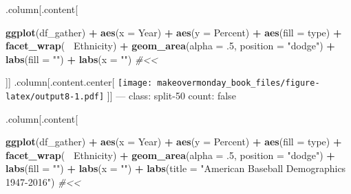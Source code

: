 \documentclass[]{book}
\newenvironment{Shaded}{\begin{snugshade}}{\end{snugshade}}
\newcommand{\KeywordTok}[1]{\textcolor[rgb]{0.13,0.29,0.53}{\textbf{#1}}}
\newcommand{\DataTypeTok}[1]{\textcolor[rgb]{0.13,0.29,0.53}{#1}}
\newcommand{\DecValTok}[1]{\textcolor[rgb]{0.00,0.00,0.81}{#1}}
\newcommand{\StringTok}[1]{\textcolor[rgb]{0.31,0.60,0.02}{#1}}
\newcommand{\CommentTok}[1]{\textcolor[rgb]{0.56,0.35,0.01}{\textit{#1}}}
\newcommand{\OperatorTok}[1]{\textcolor[rgb]{0.81,0.36,0.00}{\textbf{#1}}}
\newcommand{\NormalTok}[1]{#1}
\theoremstyle{definition}
\theoremstyle{definition}
\theoremstyle{definition}
\theoremstyle{remark}
\begin{document}
.column{[}.content{[}

\begin{Shaded}
\begin{Highlighting}[]
\KeywordTok{ggplot}\NormalTok{(df_gather) }\OperatorTok{+}
\StringTok{  }\KeywordTok{aes}\NormalTok{(}\DataTypeTok{x =}\NormalTok{ Year) }\OperatorTok{+}
\StringTok{  }\KeywordTok{aes}\NormalTok{(}\DataTypeTok{y =}\NormalTok{ Percent) }\OperatorTok{+}
\StringTok{  }\KeywordTok{aes}\NormalTok{(}\DataTypeTok{fill =}\NormalTok{ type) }\OperatorTok{+}
\StringTok{  }\KeywordTok{facet_wrap}\NormalTok{(}\OperatorTok{~}\StringTok{ }\NormalTok{Ethnicity) }\OperatorTok{+}
\StringTok{  }\KeywordTok{geom_area}\NormalTok{(}\DataTypeTok{alpha =}\NormalTok{ .}\DecValTok{5}\NormalTok{, }\DataTypeTok{position =} \StringTok{"dodge"}\NormalTok{) }\OperatorTok{+}
\StringTok{  }\KeywordTok{labs}\NormalTok{(}\DataTypeTok{fill =} \StringTok{""}\NormalTok{) }\OperatorTok{+}
\StringTok{  }\KeywordTok{labs}\NormalTok{(}\DataTypeTok{x =} \StringTok{""}\NormalTok{)  }\CommentTok{#<<}
\end{Highlighting}
\end{Shaded}

{]}{]} .column{[}.content.center{[}
\texttt{[image: makeovermonday\_book\_files/figure-latex/output8-1.pdf]}
{]}{]} --- class: split-50 count: false

.column{[}.content{[}

\begin{Shaded}
\begin{Highlighting}[]
\KeywordTok{ggplot}\NormalTok{(df_gather) }\OperatorTok{+}
\StringTok{  }\KeywordTok{aes}\NormalTok{(}\DataTypeTok{x =}\NormalTok{ Year) }\OperatorTok{+}
\StringTok{  }\KeywordTok{aes}\NormalTok{(}\DataTypeTok{y =}\NormalTok{ Percent) }\OperatorTok{+}
\StringTok{  }\KeywordTok{aes}\NormalTok{(}\DataTypeTok{fill =}\NormalTok{ type) }\OperatorTok{+}
\StringTok{  }\KeywordTok{facet_wrap}\NormalTok{(}\OperatorTok{~}\StringTok{ }\NormalTok{Ethnicity) }\OperatorTok{+}
\StringTok{  }\KeywordTok{geom_area}\NormalTok{(}\DataTypeTok{alpha =}\NormalTok{ .}\DecValTok{5}\NormalTok{, }\DataTypeTok{position =} \StringTok{"dodge"}\NormalTok{) }\OperatorTok{+}
\StringTok{  }\KeywordTok{labs}\NormalTok{(}\DataTypeTok{fill =} \StringTok{""}\NormalTok{) }\OperatorTok{+}
\StringTok{  }\KeywordTok{labs}\NormalTok{(}\DataTypeTok{x =} \StringTok{""}\NormalTok{) }\OperatorTok{+}
\StringTok{  }\KeywordTok{labs}\NormalTok{(}\DataTypeTok{title =} \StringTok{"American Baseball Demographics 1947-2016"}\NormalTok{)  }\CommentTok{#<<}
\end{Highlighting}
\end{Shaded}
\end{document}

